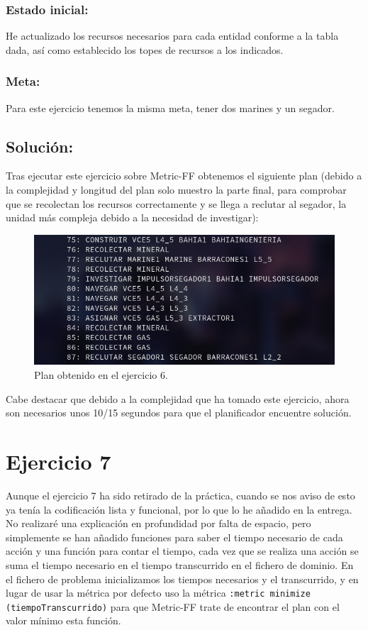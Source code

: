\documentclass[10pt, spanish]{article}
\begin{document}
\subsubsection{Estado inicial:}

He actualizado los recursos necesarios para cada entidad conforme a la tabla dada, así como establecido los topes de recursos a los indicados.

\subsubsection{Meta:}

Para este ejercicio tenemos la misma meta, tener dos marines y un segador.

\subsection{Solución:}

Tras ejecutar este ejercicio sobre Metric-FF obtenemos el siguiente plan (debido a la complejidad y longitud del plan solo muestro la parte final, para comprobar que se recolectan los recursos correctamente y se llega a reclutar al segador, la unidad más compleja debido a la necesidad de investigar): 

\begin{figure}[H]
	\centering
	\includegraphics[scale=0.4]{plan6.png}
	\caption{Plan obtenido en el ejercicio 6.}
	\label{plan6}
\end{figure}

Cabe destacar que debido a la complejidad que ha tomado este ejercicio, ahora son necesarios unos 10/15 segundos para que el planificador encuentre solución.


\section{Ejercicio 7}

Aunque el ejercicio 7 ha sido retirado de la práctica, cuando se nos aviso de esto ya tenía la codificación lista y funcional, por lo que lo he añadido en la entrega. No realizaré una explicación en profundidad por falta de espacio, pero simplemente se han añadido funciones para saber el tiempo necesario de cada acción y una función para contar el tiempo, cada vez que se realiza una acción se suma el tiempo necesario en el tiempo transcurrido en el fichero de dominio. En el fichero de problema inicializamos los tiempos necesarios y el transcurrido, y en lugar de usar la métrica por defecto uso la métrica \texttt{:metric minimize (tiempoTranscurrido)} para que Metric-FF trate de encontrar el plan con el valor mínimo esta función.
\end{document}
